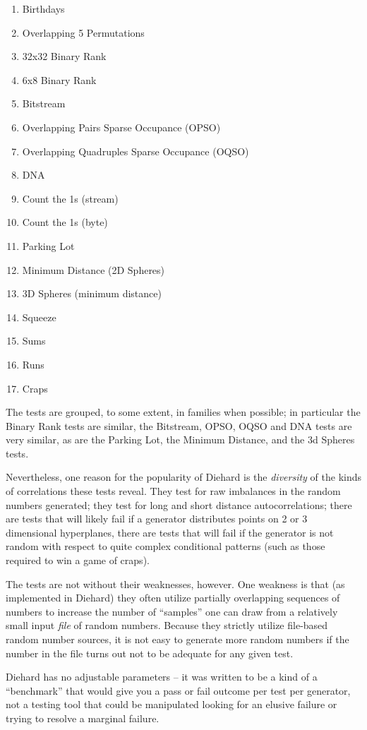 \documentclass[12pt]{book}
\begin{document}
\begin{enumerate}
 \item Birthdays 
 \item Overlapping 5 Permutations
 \item 32x32 Binary Rank 
 \item 6x8 Binary Rank 
 \item Bitstream 
 \item Overlapping Pairs Sparse Occupance (OPSO)
 \item Overlapping Quadruples Sparse Occupance (OQSO)
 \item DNA
 \item Count the 1s (stream) 
 \item Count the 1s (byte) 
 \item Parking Lot 
 \item Minimum Distance (2D Spheres) 
 \item 3D Spheres (minimum distance) 
 \item Squeeze 
 \item Sums 
 \item Runs 
 \item Craps
\end{enumerate} 
The tests are grouped, to some extent, in families when possible; in
particular the Binary Rank tests are similar, the Bitstream, OPSO, OQSO
and DNA tests are very similar, as are the Parking Lot, the Minimum
Distance, and the 3d Spheres tests.

Nevertheless, one reason for the popularity of Diehard is the {\em
diversity} of the kinds of correlations these tests reveal.  They test
for raw imbalances in the random numbers generated; they test for long
and short distance autocorrelations; there are tests that will likely
fail if a generator distributes points on 2 or 3 dimensional
hyperplanes, there are tests that will fail if the generator is not
random with respect to quite complex conditional patterns (such as those
required to win a game of craps).

The tests are not without their weaknesses, however.  One weakness is
that (as implemented in Diehard) they often utilize partially overlapping
sequences of numbers to increase the number of ``samples'' one can draw
from a relatively small input {\em file} of random numbers.  Because
they strictly utilize file-based random number sources, it is not easy
to generate more random numbers if the number in the file turns out not
to be adequate for any given test.  

Diehard has no adjustable parameters -- it was written to be a kind of a
``benchmark'' that would give you a pass or fail outcome per test per
generator, not a testing tool that could be manipulated looking for an
elusive failure or trying to resolve a marginal failure.
\end{document}
